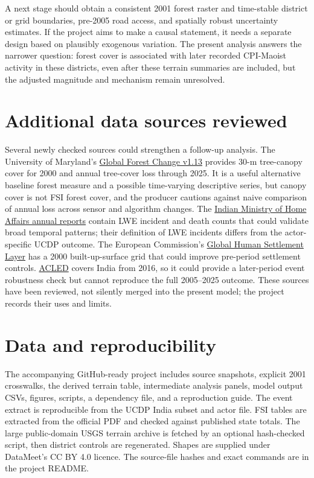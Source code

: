 \documentclass[11pt,a4paper]{article}
\begin{document}
A next stage should obtain a consistent 2001 forest raster and time-stable district or grid boundaries, pre-2005 road access, and spatially robust uncertainty estimates. If the project aims to make a causal statement, it needs a separate design based on plausibly exogenous variation. The present analysis answers the narrower question: forest cover is associated with later recorded CPI-Maoist activity in these districts, even after these terrain summaries are included, but the adjusted magnitude and mechanism remain unresolved.

\section{Additional data sources reviewed}
Several newly checked sources could strengthen a follow-up analysis. The University of Maryland's \href{https://storage.googleapis.com/earthenginepartners-hansen/GFC-2025-v1.13/download.html}{Global Forest Change v1.13} provides 30-m tree-canopy cover for 2000 and annual tree-cover loss through 2025. It is a useful alternative baseline forest measure and a possible time-varying descriptive series, but canopy cover is not FSI forest cover, and the producer cautions against naive comparison of annual loss across sensor and algorithm changes. The \href{https://www.mha.gov.in/en/documents/annual-reports}{Indian Ministry of Home Affairs annual reports} contain LWE incident and death counts that could validate broad temporal patterns; their definition of LWE incidents differs from the actor-specific UCDP outcome. The European Commission's \href{https://human-settlement.emergency.copernicus.eu/ghs_buS2023.php}{Global Human Settlement Layer} has a 2000 built-up-surface grid that could improve pre-period settlement controls. \href{https://acleddata.com/methodology/countrytime-period-coverage}{ACLED} covers India from 2016, so it could provide a later-period event robustness check but cannot reproduce the full 2005--2025 outcome. These sources have been reviewed, not silently merged into the present model; the project records their uses and limits.

\section*{Data and reproducibility}
The accompanying GitHub-ready project includes source snapshots, explicit 2001 crosswalks, the derived terrain table, intermediate analysis panels, model output CSVs, figures, scripts, a dependency file, and a reproduction guide. The event extract is reproducible from the UCDP India subset and actor file. FSI tables are extracted from the official PDF and checked against published state totals. The large public-domain USGS terrain archive is fetched by an optional hash-checked script, then district controls are regenerated. Shapes are supplied under DataMeet's CC BY 4.0 licence. The source-file hashes and exact commands are in the project README.
\end{document}
